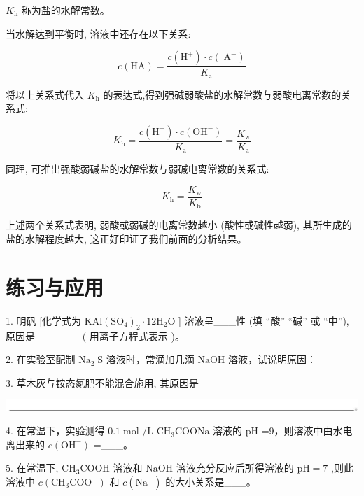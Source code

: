 \documentclass[10pt]{article}
\begin{document}
\({K}_{\mathrm{h}}\) 称为盐的水解常数。

当水解达到平衡时, 溶液中还存在以下关系:

\[
c\left( \mathrm{{HA}}\right) = \frac{c\left( {\mathrm{H}}^{ + }\right) \cdot c\left( {\mathrm{\;A}}^{ - }\right) }{{K}_{\mathrm{a}}}
\]

将以上关系式代入 \({K}_{\mathrm{h}}\) 的表达式,得到强碱弱酸盐的水解常数与弱酸电离常数的关系式:

\[
{K}_{\mathrm{h}} = \frac{c\left( {\mathrm{H}}^{ + }\right) \cdot c\left( {\mathrm{{OH}}}^{ - }\right) }{{K}_{\mathrm{a}}} = \frac{{K}_{\mathrm{w}}}{{K}_{\mathrm{a}}}
\]

同理, 可推出强酸弱碱盐的水解常数与弱碱电离常数的关系式:

\[
{K}_{\mathrm{h}} = \frac{{K}_{\mathrm{w}}}{{K}_{\mathrm{b}}}
\]

上述两个关系式表明, 弱酸或弱碱的电离常数越小 (酸性或碱性越弱), 其所生成的盐的水解程度越大, 这正好印证了我们前面的分析结果。

\section*{练习与应用}

1. 明矾 [化学式为 \({\mathrm{{KAl}\left( {S{O}_{4}}\right) }}_{2} \cdot {12}{\mathrm{H}}_{2}\mathrm{O}\) ] 溶液呈\_\_\_性 (填 “酸” “碱” 或 “中”), 原因是\_\_\_ \_\_\_( 用离子方程式表示 )。

2. 在实验室配制 \({\mathrm{{Na}}}_{2}\mathrm{\;S}\) 溶液时，常滴加几滴 \(\mathrm{{NaOH}}\) 溶液，试说明原因：\_\_\_

3. 草木灰与铵态氮肥不能混合施用, 其原因是

\begin{center}
\includegraphics[max width=1.0\textwidth]{images/0190da9d-8bfd-732f-bc2c-0b21d0f13b91_83_734524.jpg}
\end{center}

4. 在常温下，实验测得 \({0.1}\mathrm{\;{mol}}\) /L \({\mathrm{{CH}}}_{3}\mathrm{{COONa}}\) 溶液的 \(\mathrm{{pH}}\) =9，则溶液中由水电离出来的 \(c\left( {\mathrm{{OH}}}^{ - }\right)\) =\_\_\_。

5. 在常温下, \({\mathrm{{CH}}}_{3}\mathrm{{COOH}}\) 溶液和 \(\mathrm{{NaOH}}\) 溶液充分反应后所得溶液的 \(\mathrm{{pH}} = 7\) ,则此溶液中 \(c\left( {{\mathrm{{CH}}}_{3}{\mathrm{{COO}}}^{ - }}\right)\) 和 \(c\left( {\mathrm{{Na}}}^{ + }\right)\) 的大小关系是\_\_\_。
\end{document}
